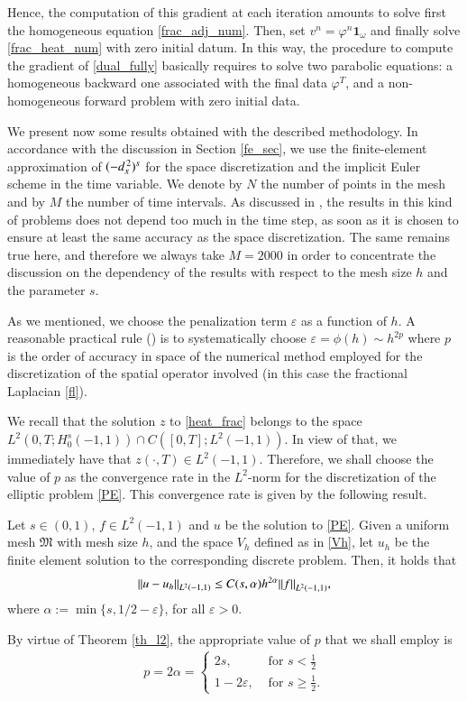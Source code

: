 Hence, the computation of this gradient at each iteration amounts to solve first the homogeneous equation \eqref{frac_adj_num}. Then, set $v^n=\varphi^n\mathbf{1}_\omega$ and finally solve \eqref{frac_heat_num} with zero initial datum. In this way, the procedure to compute the gradient of \eqref{dual_fully} basically requires to solve two parabolic equations: a homogeneous backward one associated with the final data $\varphi^T$, and a non-homogeneous forward problem with zero initial data. 

We present now some results obtained with the described methodology. In accordance with the discussion in Section \ref{fe_sec}, we use the finite-element approximation of $(-d_x^{\,2})^{s}$ for the space discretization and the implicit Euler scheme in the time variable. We denote by $N$ the number of points in the mesh and by $M$ the number of time intervals. As discussed in \cite{boyer2011uniform}, the results in this kind of problems does not depend too much in the time step, as soon as it is chosen to ensure at least the same accuracy as the space discretization. The same remains true here, and therefore we always take $M=2000$ in order to concentrate the discussion on the dependency of the results with respect to the mesh size $h$ and the parameter $s$.

As we mentioned, we choose the penalization term $\varepsilon$ as a function of $h$. A reasonable practical rule (\cite{boyer2013penalised}) is to systematically choose $\varepsilon=\phi(h)\sim h^{2p}$ where $p$ is the order of accuracy in space of the numerical method employed for the discretization of the spatial operator involved (in this case the fractional Laplacian \eqref{fl}).

We recall that the solution $z$ to \eqref{heat_frac} belongs to the space $L^2(0,T;H_0^s(-1,1))\cap C([0,T];L^2(-1,1))$. In view of that, we immediately have that $z(\cdot,T)\in L^2(-1,1)$. Therefore, we shall choose the value of $p$ as the convergence rate in the $L^2$-norm for the discretization of the elliptic problem \eqref{PE}. This convergence rate is given by the following result.

\begin{theorem}\label{th_l2}
Let $s\in(0,1)$, $f\in L^2(-1,1)$ and $u$ be the solution to \eqref{PE}. Given a uniform mesh $\mathfrak{M}$ with mesh size $h$,
and the space $V_h$ defined as in \eqref{Vh}, let $u_h$ be the finite element solution to the corresponding discrete 
problem. Then, it holds that
\begin{align*}
	{\left\|u-u_h\right\|}_{L^2(-1,1)}\leq C(s,\alpha)h^{2\alpha}{\left\|f\right\|}_{L^2(-1,1)},
\end{align*}
where $\alpha:=\min\{s, 1/2 -\varepsilon\}$, for all $\varepsilon>0$.
\end{theorem}
By virtue of Theorem \ref{th_l2}, the appropriate value of $p$ that we shall employ is
\begin{align*}
	p = 2\alpha = \begin{cases}
					2s, & \textrm{ for }s<\frac 12
					\\
					1-2\varepsilon, & \textrm{ for }s\geq \frac 12.
	\end{cases}
\end{align*}


